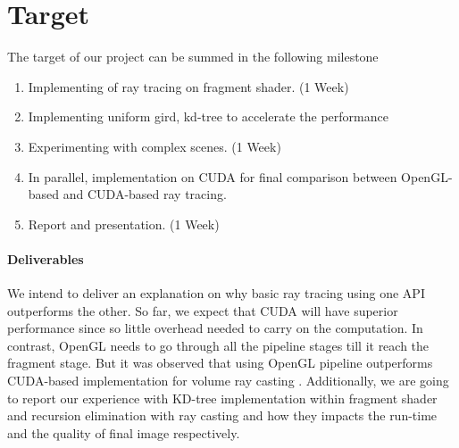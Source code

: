 \section{Target}
The target of our project can be summed in the following milestone 
\begin{enumerate}
\item Implementing of ray tracing on fragment shader. (1 Week)
\item Implementing uniform gird, kd-tree to accelerate the performance
\item Experimenting with complex scenes. (1 Week)
\item In parallel, implementation on CUDA for final comparison between OpenGL-based and CUDA-based ray tracing.
\item Report and presentation. (1 Week)
\end{enumerate}

\paragraph{Deliverables} We intend to deliver an explanation on why basic ray tracing using one API outperforms the other. So far, we expect that CUDA will have superior performance since so little overhead needed to carry on the computation. In contrast, OpenGL needs to go through all the pipeline stages till it reach the fragment stage. But it was observed that using OpenGL pipeline outperforms CUDA-based implementation for volume ray casting \cite{7833400}. Additionally, we are going to report our experience with KD-tree implementation within fragment shader and recursion elimination with ray casting and how they impacts the run-time and the quality of final image respectively. 